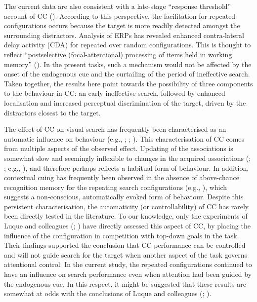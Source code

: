 \documentclass[
  man,
  floatsintext,
  longtable,
  nolmodern,
  notxfonts,
  notimes,
  colorlinks=true,linkcolor=blue,citecolor=blue,urlcolor=blue]{apa7}
\begin{document}
The current data are also consistent with a late-stage ``response
threshold'' account of CC (). According to this perspective, the facilitation for repeated
configurations occurs because the target is more readily detected
amongst the surrounding distractors. Analysis of ERPs has revealed
enhanced contra-lateral delay activity (CDA) for repeated over random
configurations. This is thought to reflect ``postselective
(focal-attentional) processing of items held in working memory''
(). In the present tasks, such
a mechanism would not be affected by the onset of the endogenous cue and
the curtailing of the period of ineffective search. Taken together, the
results here point towards the possibility of three components to the
behaviour in CC: an early ineffective search, followed by enhanced
localisation and increased perceptual discrimination of the target,
driven by the distractors closest to the target.

The effect of CC on visual search has frequently been characterised as
an automatic influence on behaviour (e.g., ; ;
). This characterisation of
CC comes from multiple aspects of the observed effect. Updating of the
associations is somewhat slow and seemingly inflexible to changes in the
acquired associations (; ;
e.g., ), and therefore
perhaps reflects a habitual form of behaviour. In addition, contextual
cuing has frequently been observed in the absence of above-chance
recognition memory for the repeating search configurations (e.g.,
), which
suggests a non-conscious, automatically evoked form of behaviour.
Despite this persistent characterisation, the automaticity (or
controllability) of CC has rarely been directly tested in the
literature. To our knowledge, only the experiments of Luque and
colleagues (;
) have directly assessed
this aspect of CC, by placing the influence of the configuration in
competition with top-down goals in the task. Their findings supported
the conclusion that CC performance can be controlled and will not guide
search for the target when another aspect of the task governs
attentional control. In the current study, the repeated configurations
continued to have an influence on search performance even when attention
had been guided by the endogenous cue. In this respect, it might be
suggested that these results are somewhat at odds with the conclusions
of Luque and colleagues (;
).
\end{document}
